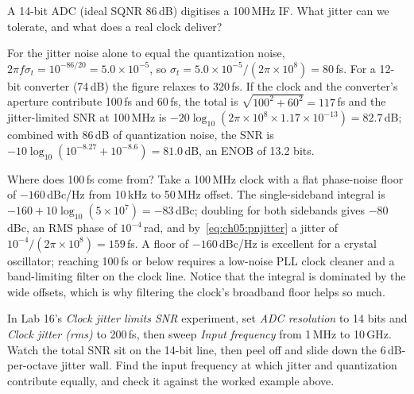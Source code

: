 
\begin{worked}
A 14-bit ADC (ideal SQNR 86\,dB) digitises a 100\,MHz IF. What jitter can we tolerate, and what
does a real clock deliver?

For the jitter noise alone to equal the quantization noise, $2\pi f\sigma_t=10^{-86/20}=5.0\times10^{-5}$,
so $\sigma_t=5.0\times10^{-5}/(2\pi\times10^8)=80$\,fs. For a 12-bit converter (74\,dB) the
figure relaxes to 320\,fs. If the clock and the converter's aperture contribute 100\,fs and
60\,fs, the total is $\sqrt{100^2+60^2}=117$\,fs and the jitter-limited SNR at 100\,MHz is
$-20\log_{10}(2\pi\times10^8\times1.17\times10^{-13})=82.7$\,dB; combined with 86\,dB of
quantization noise, the SNR is $-10\log_{10}(10^{-8.27}+10^{-8.6})=81.0$\,dB, an ENOB of 13.2 bits.

Where does 100\,fs come from? Take a 100\,MHz clock with a flat phase-noise floor of
$-160$\,dBc/Hz from 10\,kHz to 50\,MHz offset. The single-sideband integral is
$-160+10\log_{10}(5\times10^7)=-83$\,dBc; doubling for both sidebands gives $-80$\,dBc, an RMS
phase of $10^{-4}$\,rad, and by~\eqref{eq:ch05:pnjitter} a jitter of
$10^{-4}/(2\pi\times10^8)=159$\,fs. A floor of $-160$\,dBc/Hz is excellent for a crystal oscillator;
reaching 100\,fs or below requires a low-noise PLL clock cleaner and a band-limiting filter on
the clock line. Notice that the integral is dominated by the wide offsets, which is why
filtering the clock's broadband floor helps so much.
\end{worked}

\begin{tryit}
In Lab 16's \emph{Clock jitter limits SNR} experiment, set \emph{ADC resolution} to 14 bits and
\emph{Clock jitter (rms)} to 200\,fs, then sweep \emph{Input frequency} from 1\,MHz to 10\,GHz.
Watch the total SNR sit on the 14-bit line, then peel off and slide down the 6\,dB-per-octave
jitter wall. Find the input frequency at which jitter and quantization contribute equally, and
check it against the worked example above.
\end{tryit}

